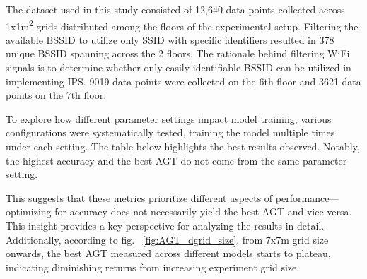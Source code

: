 \documentclass[runningheads]{llncs}
\begin{document}
The dataset used in this study consisted of 12,640 data points collected across 1x1m\textsuperscript{2} grids distributed among the floors of the experimental setup. Filtering the available BSSID to utilize only SSID with specific identifiers resulted in 378 unique BSSID spanning across the 2 floors. The rationale behind filtering WiFi signals is to determine whether only easily identifiable BSSID can be utilized in implementing IPS. 9019 data points were collected on the 6th floor and 3621 data points on the 7th floor.

To explore how different parameter settings impact model training, various configurations were systematically tested, training the model multiple times under each setting. The table below highlights the best results observed. Notably, the highest accuracy and the best AGT do not come from the same parameter setting.



This suggests that these metrics prioritize different aspects of performance—optimizing for accuracy does not necessarily yield the best AGT and vice versa. This insight provides a key perspective for analyzing the results in detail. Additionally, according to fig. ~\ref{fig:AGT_dgrid_size}, from 7x7m grid size onwards, the best AGT measured across different models starts to plateau, indicating diminishing returns from increasing experiment grid size.
\end{document}
